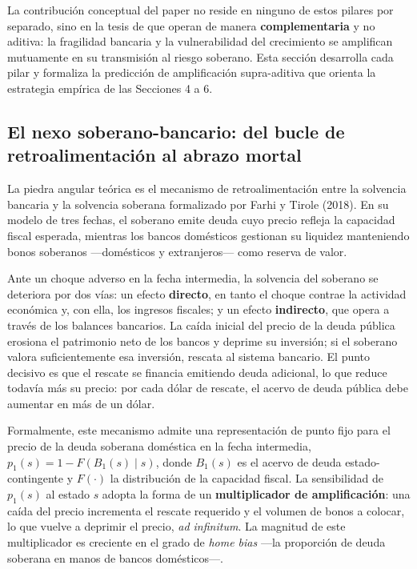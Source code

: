 \documentclass[5p,times,twocolumn,authoryear]{elsarticle}
\begin{document}
La contribución conceptual del paper no reside en ninguno de estos pilares por separado, sino en la tesis de que operan de manera \textbf{complementaria} y no aditiva: la fragilidad bancaria y la vulnerabilidad del crecimiento se amplifican mutuamente en su transmisión al riesgo soberano. Esta sección desarrolla cada pilar y formaliza la predicción de amplificación supra-aditiva que orienta la estrategia empírica de las Secciones 4 a 6.

\subsection{El nexo soberano-bancario: del bucle de retroalimentación al abrazo mortal}

La piedra angular teórica es el mecanismo de retroalimentación entre la solvencia bancaria y la solvencia soberana formalizado por Farhi y Tirole (2018). En su modelo de tres fechas, el soberano emite deuda cuyo precio refleja la capacidad fiscal esperada, mientras los bancos domésticos gestionan su liquidez manteniendo bonos soberanos —domésticos y extranjeros— como reserva de valor.

Ante un choque adverso en la fecha intermedia, la solvencia del soberano se deteriora por dos vías: un efecto \textbf{directo}, en tanto el choque contrae la actividad económica y, con ella, los ingresos fiscales; y un efecto \textbf{indirecto}, que opera a través de los balances bancarios. La caída inicial del precio de la deuda pública erosiona el patrimonio neto de los bancos y deprime su inversión; si el soberano valora suficientemente esa inversión, rescata al sistema bancario. El punto decisivo es que el rescate se financia emitiendo deuda adicional, lo que reduce todavía más su precio: por cada dólar de rescate, el acervo de deuda pública debe aumentar en más de un dólar.

Formalmente, este mecanismo admite una representación de punto fijo para el precio de la deuda soberana doméstica en la fecha intermedia, $p_1(s) = 1 - F\!\left(B_1(s)\mid s\right)$, donde $B_1(s)$ es el acervo de deuda estado-contingente y $F(\cdot)$ la distribución de la capacidad fiscal. La sensibilidad de $p_1(s)$ al estado $s$ adopta la forma de un \textbf{multiplicador de amplificación}: una caída del precio incrementa el rescate requerido y el volumen de bonos a colocar, lo que vuelve a deprimir el precio, \textit{ad infinitum}. La magnitud de este multiplicador es creciente en el grado de \textit{home bias} —la proporción de deuda soberana en manos de bancos domésticos—.
\end{document}
